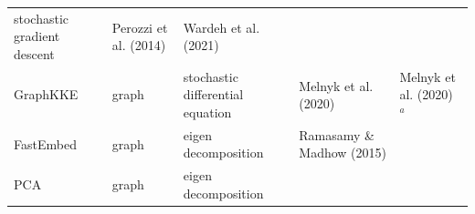 \documentclass[10pt,oneside]{article}
\begin{document}
\begin{longtable}[]{@{}lllll@{}}
\begin{minipage}[t]{0.23\columnwidth}
stochastic gradient descent\strut
\end{minipage} & \begin{minipage}[t]{0.14\columnwidth}\raggedright
Perozzi et al. (2014)\strut
\end{minipage} & \begin{minipage}[t]{0.29\columnwidth}\raggedright
Wardeh et al. (2021)\strut
\end{minipage}\tabularnewline
\begin{minipage}[t]{0.09\columnwidth}\raggedright
GraphKKE\strut
\end{minipage} & \begin{minipage}[t]{0.11\columnwidth}\raggedright
graph\strut
\end{minipage} & \begin{minipage}[t]{0.23\columnwidth}\raggedright
stochastic differential equation\strut
\end{minipage} & \begin{minipage}[t]{0.14\columnwidth}\raggedright
Melnyk et al. (2020)\strut
\end{minipage} & \begin{minipage}[t]{0.29\columnwidth}\raggedright
Melnyk et al. (2020) \(^a\)\strut
\end{minipage}\tabularnewline
\begin{minipage}[t]{0.09\columnwidth}\raggedright
FastEmbed\strut
\end{minipage} & \begin{minipage}[t]{0.11\columnwidth}\raggedright
graph\strut
\end{minipage} & \begin{minipage}[t]{0.23\columnwidth}\raggedright
eigen decomposition\strut
\end{minipage} & \begin{minipage}[t]{0.14\columnwidth}\raggedright
Ramasamy \& Madhow (2015)\strut
\end{minipage} & \begin{minipage}[t]{0.29\columnwidth}\raggedright
\strut
\end{minipage}\tabularnewline
\begin{minipage}[t]{0.09\columnwidth}\raggedright
PCA\strut
\end{minipage} & \begin{minipage}[t]{0.11\columnwidth}\raggedright
graph\strut
\end{minipage} & \begin{minipage}[t]{0.23\columnwidth}\raggedright
eigen decomposition\strut

\end{minipage}
\end{longtable}
\end{document}
